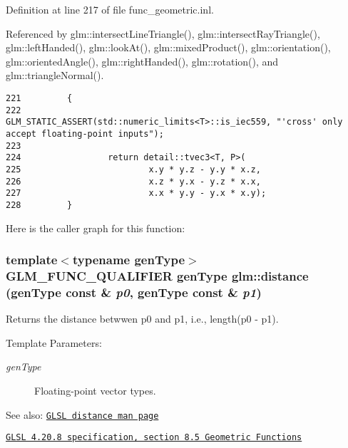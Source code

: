 Definition at line 217 of file func\_\-geometric.inl.

Referenced by glm::intersectLineTriangle(), glm::intersectRayTriangle(), glm::leftHanded(), glm::lookAt(), glm::mixedProduct(), glm::orientation(), glm::orientedAngle(), glm::rightHanded(), glm::rotation(), and glm::triangleNormal().

\begin{Code}\begin{verbatim}221         {
222                 GLM_STATIC_ASSERT(std::numeric_limits<T>::is_iec559, "'cross' only accept floating-point inputs");
223 
224                 return detail::tvec3<T, P>(
225                         x.y * y.z - y.y * x.z,
226                         x.z * y.x - y.z * x.x,
227                         x.x * y.y - y.x * x.y);
228         }
\end{verbatim}
\end{Code}




Here is the caller graph for this function:\hypertarget{group__core__func__geometric_gd21e00cab9f8b4eb6d1214a16dee06c7}{
\subsubsection[distance]{\setlength{\rightskip}{0pt plus 5cm}template$<$typename genType$>$ GLM\_\-FUNC\_\-QUALIFIER genType glm::distance (genType const \& {\em p0}, \/  genType const \& {\em p1})}}
\label{group__core__func__geometric_gd21e00cab9f8b4eb6d1214a16dee06c7}


Returns the distance betwwen p0 and p1, i.e., length(p0 - p1).

\begin{Desc}
\item[Template Parameters:]
\begin{description}
\item[{\em genType}]Floating-point vector types.\end{description}
\end{Desc}
\begin{Desc}
\item[See also:]\href{http://www.opengl.org/sdk/docs/manglsl/xhtml/distance.xml}{\tt GLSL distance man page} 

\href{http://www.opengl.org/registry/doc/GLSLangSpec.4.20.8.pdf}{\tt GLSL 4.20.8 specification, section 8.5 Geometric Functions} \end{Desc}


